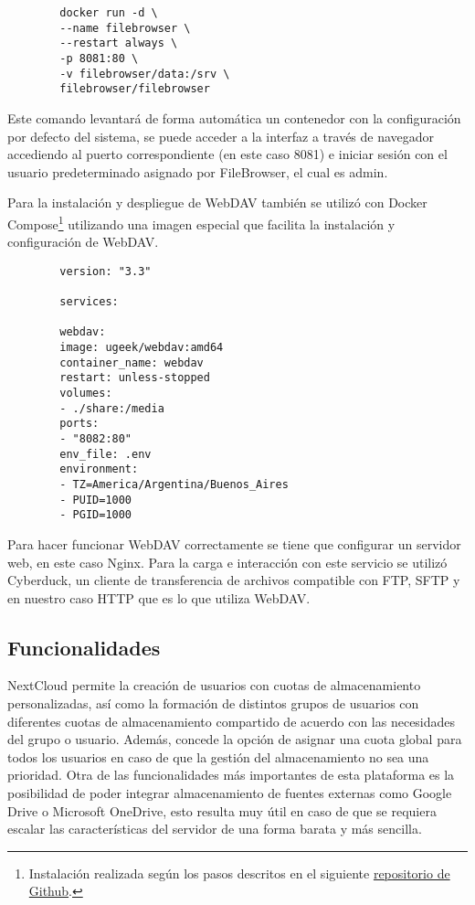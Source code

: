 \documentclass[a4paper,10pt]{article}
\begin{document}
	\begin{verbatim}
		docker run -d \
		--name filebrowser \
		--restart always \
		-p 8081:80 \
		-v filebrowser/data:/srv \
		filebrowser/filebrowser
	\end{verbatim}
	
	Este comando levantará de forma automática un contenedor con la configuración por defecto del sistema, se puede acceder a la interfaz a través de navegador accediendo al puerto correspondiente (en este caso 8081) e iniciar sesión con el usuario predeterminado asignado por FileBrowser, el cual es admin.
	
	Para la instalación y despliegue de WebDAV también se utilizó con Docker Compose\footnote{Instalación realizada según los pasos descritos en el siguiente \href{https://github.com/jmlcas/webdav/}{repositorio de Github}.} utilizando una imagen especial que facilita la instalación y configuración de WebDAV. 
	
	\begin{verbatim}
		version: "3.3"
		
		services:
		
		webdav:
		image: ugeek/webdav:amd64    
		container_name: webdav
		restart: unless-stopped
		volumes:
		- ./share:/media
		ports:
		- "8082:80"
		env_file: .env 	 
		environment:
		- TZ=America/Argentina/Buenos_Aires
		- PUID=1000
		- PGID=1000
	\end{verbatim}
	
	Para hacer funcionar WebDAV correctamente se tiene que configurar un servidor web, en este caso Nginx. Para la carga e interacción con este servicio se utilizó Cyberduck, un cliente de transferencia de archivos compatible con FTP, SFTP y en nuestro caso HTTP que es lo que utiliza WebDAV.
	
	\subsection{Funcionalidades}
	NextCloud permite la creación de usuarios con cuotas de almacenamiento personalizadas, así como la formación de distintos grupos de usuarios con diferentes cuotas de almacenamiento compartido de acuerdo con las necesidades del grupo o usuario. Además, concede la opción de asignar una cuota global para todos los usuarios en caso de que la gestión del almacenamiento no sea una prioridad. Otra de las funcionalidades más importantes de esta plataforma es la posibilidad de poder integrar almacenamiento de fuentes externas como Google Drive o Microsoft OneDrive, esto resulta muy útil en caso de que se requiera escalar las características del servidor de una forma barata y más sencilla.
	
\end{document}
